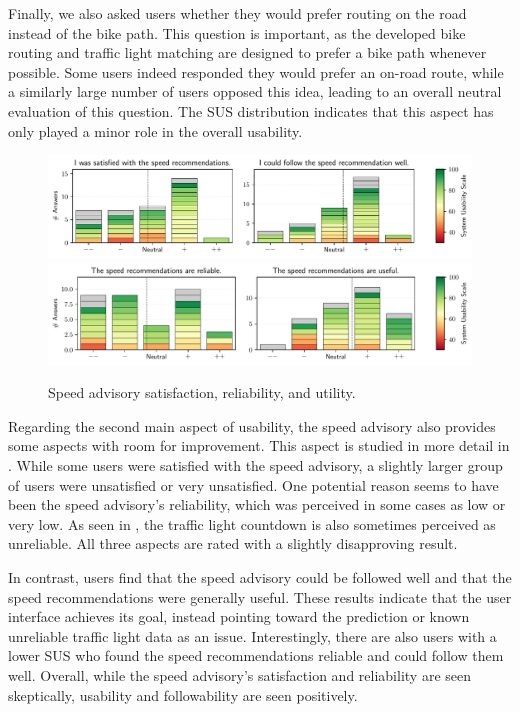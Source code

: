 Finally, we also asked users whether they would prefer routing on the road instead of the bike path. This question is important, as the developed bike routing and traffic light matching are designed to prefer a bike path whenever possible. Some users indeed responded they would prefer an on-road route, while a similarly large number of users opposed this idea, leading to an overall neutral evaluation of this question. The SUS distribution indicates that this aspect has only played a minor role in the overall usability.

\begin{figure}[t]
\caption{Speed advisory satisfaction, reliability, and utility.}\label{fig:speed-recommendations-satisfaction}
\includegraphics[width=\linewidth]{images/app-usability-questions-speed-recommendations-satisfaction.pdf}
\\
\includegraphics[width=\linewidth]{images/app-usability-questions-speed-recommendations-reliability.pdf}
\end{figure}

Regarding the second main aspect of usability, the speed advisory also provides some aspects with room for improvement. This aspect is studied in more detail in . While some users were satisfied with the speed advisory, a slightly larger group of users were unsatisfied or very unsatisfied. One potential reason seems to have been the speed advisory's reliability, which was perceived in some cases as low or very low. As seen in  , the traffic light countdown is also sometimes perceived as unreliable. All three aspects are rated with a slightly disapproving result.

In contrast, users find that the speed advisory could be followed well and that the speed recommendations were generally useful. These results indicate that the user interface achieves its goal, instead pointing toward the prediction or known unreliable traffic light data as an issue. Interestingly, there are also users with a lower SUS who found the speed recommendations reliable and could follow them well. Overall, while the speed advisory's satisfaction and reliability are seen skeptically, usability and followability are seen positively.

